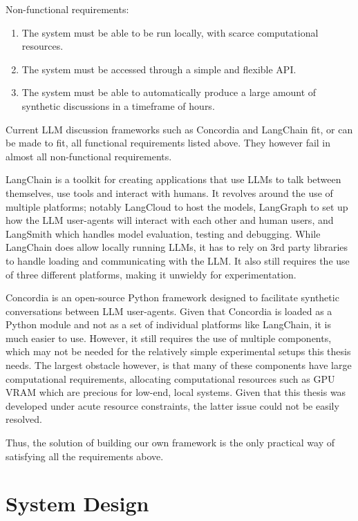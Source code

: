 Non-functional requirements:
\begin{enumerate}
	\item The system must be able to be run locally, with scarce computational resources.
	\item The system must be accessed through a simple and flexible \ac{API}.
	\item The system must be able to automatically produce a large amount of synthetic discussions in a timeframe of hours.
\end{enumerate}

Current LLM discussion frameworks such as Concordia \cite{Vezhnevets2023GenerativeAM} and LangChain \cite{langchain} fit, or can be made to fit, all functional requirements listed above. They however fail in almost all non-functional requirements. 

LangChain is a toolkit for creating applications that use LLMs to talk between themselves, use tools and interact with humans. It revolves around the use of multiple platforms; notably LangCloud to host the models, LangGraph to set up how the LLM user-agents will interact with each other and human users, and LangSmith which handles model evaluation, testing and debugging. While LangChain does allow locally running LLMs, it has to rely on 3rd party libraries to handle loading and communicating with the LLM. It also still requires the use of three different platforms, making it unwieldy for experimentation.

Concordia is an open-source Python framework designed to facilitate synthetic conversations between LLM user-agents. Given that Concordia is loaded as a Python module and not as a set of individual platforms like LangChain, it is much easier to use. However, it still requires the use of multiple components, which may not be needed for the relatively simple experimental setups this thesis needs. The largest obstacle however, is that many of these components have large computational requirements, allocating computational resources such as GPU VRAM which are precious for low-end, local systems. Given that this thesis was developed under acute resource constraints, the latter issue could not be easily resolved.

Thus, the solution of building our own framework is the only practical way of satisfying all the requirements above.



\section{System Design}
\label{sec:system:design-system}

